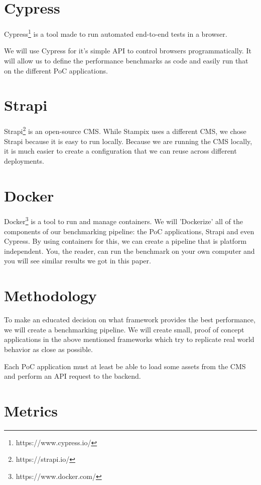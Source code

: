 \section{Cypress}

Cypress\footnote{https://www.cypress.io/} is a tool made to run automated end-to-end tests in a browser. 

We will use Cypress for it's simple API to control browsers programmatically. It will allow us to define the performance benchmarks as code and easily run that on the different PoC applications.

\section{Strapi}

Strapi\footnote{https://strapi.io/} is an open-source CMS. While Stampix uses a different CMS, we chose Strapi because it is easy to run locally. 
Because we are running the CMS locally, it is much easier to create a configuration that we can reuse across different deployments. 


\section{Docker}

Docker\footnote{https://www.docker.com/} is a tool to run and manage containers. We will 'Dockerize' all of the components of our benchmarking pipeline: the PoC applications, Strapi and even Cypress. 
By using containers for this, we can create a pipeline that is platform independent. You, the reader, can run the benchmark on your own computer and you will see similar results we got in this paper.


\section{Methodology}

To make an educated decision on what framework provides the best performance, we will create a benchmarking pipeline. 
We will create small, proof of concept applications in the above mentioned frameworks which try to replicate real world behavior as close as possible.

Each PoC application must at least be able to load some assets from the CMS and perform an API request to the backend.


\section{Metrics}

